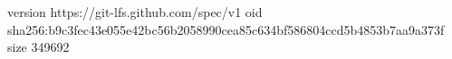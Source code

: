 version https://git-lfs.github.com/spec/v1
oid sha256:b9c3fec43e055e42bc56b2058990cea85c634bf586804ccd5b4853b7aa9a373f
size 349692
